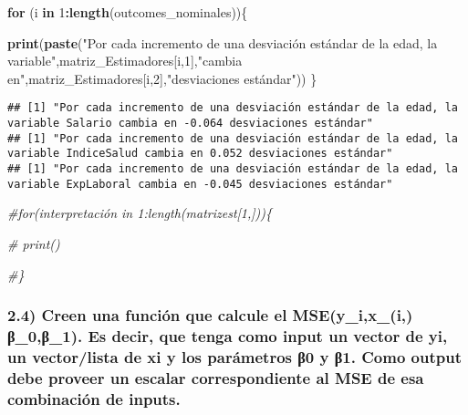 \documentclass[
]{article}
\newenvironment{Shaded}{\begin{snugshade}}{\end{snugshade}}
\newcommand{\CommentTok}[1]{\textcolor[rgb]{0.56,0.35,0.01}{\textit{#1}}}
\newcommand{\ControlFlowTok}[1]{\textcolor[rgb]{0.13,0.29,0.53}{\textbf{#1}}}
\newcommand{\DecValTok}[1]{\textcolor[rgb]{0.00,0.00,0.81}{#1}}
\newcommand{\FunctionTok}[1]{\textcolor[rgb]{0.13,0.29,0.53}{\textbf{#1}}}
\newcommand{\NormalTok}[1]{#1}
\newcommand{\SpecialCharTok}[1]{\textcolor[rgb]{0.81,0.36,0.00}{\textbf{#1}}}
\newcommand{\StringTok}[1]{\textcolor[rgb]{0.31,0.60,0.02}{#1}}
\begin{document}
\begin{Shaded}
\begin{Highlighting}[]
\ControlFlowTok{for}\NormalTok{ (i }\ControlFlowTok{in} \DecValTok{1}\SpecialCharTok{:}\FunctionTok{length}\NormalTok{(outcomes\_nominales))\{}

    \FunctionTok{print}\NormalTok{(}\FunctionTok{paste}\NormalTok{(}\StringTok{"Por cada incremento de una desviación estándar de la edad, la variable"}\NormalTok{,matriz\_Estimadores[i,}\DecValTok{1}\NormalTok{],}\StringTok{"cambia en"}\NormalTok{,matriz\_Estimadores[i,}\DecValTok{2}\NormalTok{],}\StringTok{"desviaciones estándar"}\NormalTok{))}
\NormalTok{\}}
\end{Highlighting}
\end{Shaded}

\begin{verbatim}
## [1] "Por cada incremento de una desviación estándar de la edad, la variable Salario cambia en -0.064 desviaciones estándar"
## [1] "Por cada incremento de una desviación estándar de la edad, la variable IndiceSalud cambia en 0.052 desviaciones estándar"
## [1] "Por cada incremento de una desviación estándar de la edad, la variable ExpLaboral cambia en -0.045 desviaciones estándar"
\end{verbatim}

\begin{Shaded}
\begin{Highlighting}[]
\CommentTok{\#for(interpretación in 1:length(matrizest[1,]))\{}
  
 \CommentTok{\# print()}
  
\CommentTok{\#\}}
\end{Highlighting}
\end{Shaded}

\hypertarget{creen-una-funciuxf3n-que-calcule-el-msey_ix_i-ux3b2_0ux3b2_1.-es-decir-que-tenga-como-input-un-vector-de-yi-un-vectorlista-de-xi-y-los-paruxe1metros-ux3b20-y-ux3b21.-como-output-debe-proveer-un-escalar-correspondiente-al-mse-de-esa-combinaciuxf3n-de-inputs.}{%
\subsubsection{2.4) Creen una función que calcule el MSE(y\_i,x\_(i,)
β\_0,β\_1). Es decir, que tenga como input un vector de yi, un
vector/lista de xi y los parámetros β0 y β1. Como output debe proveer un
escalar correspondiente al MSE de esa combinación de
inputs.}\label{creen-una-funciuxf3n-que-calcule-el-msey_ix_i-ux3b2_0ux3b2_1.-es-decir-que-tenga-como-input-un-vector-de-yi-un-vectorlista-de-xi-y-los-paruxe1metros-ux3b20-y-ux3b21.-como-output-debe-proveer-un-escalar-correspondiente-al-mse-de-esa-combinaciuxf3n-de-inputs.}}
\end{document}
